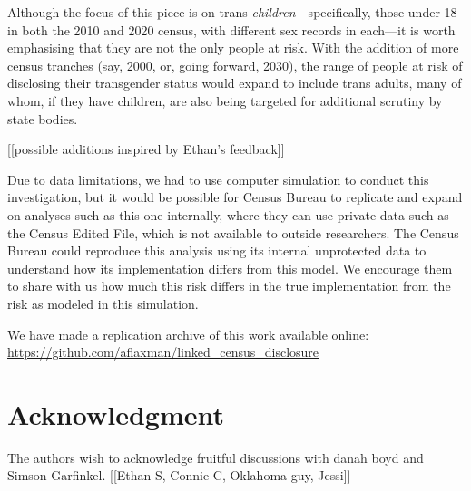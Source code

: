 \documentclass{jpc} %
\theoremstyle{plain}\newtheorem{satz}[thm]{Satz} %
\begin{document}
Although the focus of this piece is on trans \textit{children}---specifically, those under 18 in both the 2010 and 2020 census, with different sex records in each---it is worth emphasising that they are not the only people at risk. With the addition of more census tranches (say, 2000, or, going forward, 2030), the range of people at risk of disclosing their transgender status would expand to include trans adults, many of whom, if they have children, are also being targeted for additional scrutiny by state bodies.

[[possible additions inspired by Ethan's feedback]]

Due to data limitations, we had to use computer simulation to conduct this investigation, but it would be possible for Census Bureau to replicate and expand on analyses such as this one internally, where they can use private data such as the Census Edited File, which is not available to outside researchers.  The Census Bureau could reproduce this analysis using its internal unprotected data to understand how its implementation differs from this model. We encourage them to share with us how much this risk differs in the true implementation from the risk as modeled in this simulation.

We have made a replication archive of this work available online: \url{https://github.com/aflaxman/linked_census_disclosure}
 
\section*{Acknowledgment}
  \noindent The authors wish to acknowledge fruitful discussions with danah boyd and Simson Garfinkel. [[Ethan S, Connie C, Oklahoma guy, Jessi]]




\end{document}
